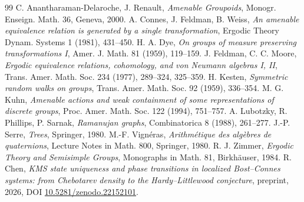 \documentclass[11pt]{amsart}
\numberwithin{equation}{section}
\theoremstyle{definition}
\theoremstyle{remark}
\begin{document}
\begin{thebibliography}{99}
 C. Anantharaman-Delaroche, J. Renault, \emph{Amenable Groupoids}, Monogr.
Enseign. Math. 36, Geneva, 2000.
 A. Connes, J. Feldman, B. Weiss, \emph{An amenable equivalence relation is generated
by a single transformation}, Ergodic Theory Dynam. Systems 1 (1981), 431--450.
 H. A. Dye, \emph{On groups of measure preserving transformations I}, Amer. J. Math.
81 (1959), 119--159.
 J. Feldman, C. C. Moore, \emph{Ergodic equivalence relations, cohomology, and von
Neumann algebras I, II}, Trans. Amer. Math. Soc. 234 (1977), 289--324, 325--359.
 H. Kesten, \emph{Symmetric random walks on groups}, Trans. Amer. Math. Soc. 92
(1959), 336--354.
 M. G. Kuhn, \emph{Amenable actions and weak containment of some representations of
discrete groups}, Proc. Amer. Math. Soc. 122 (1994), 751--757.
 A. Lubotzky, R. Phillips, P. Sarnak, \emph{Ramanujan graphs}, Combinatorica 8
(1988), 261--277.
 J.-P. Serre, \emph{Trees}, Springer, 1980.
 M.-F. Vign\'eras, \emph{Arithm\'etique des alg\`ebres de quaternions}, Lecture
Notes in Math. 800, Springer, 1980.
 R. J. Zimmer, \emph{Ergodic Theory and Semisimple Groups}, Monographs in Math.
81, Birkh\"auser, 1984.
 R. Chen, \emph{KMS state uniqueness and phase transitions in localized Bost--Connes
systems: from Chebotarev density to the Hardy--Littlewood conjecture}, preprint, 2026, DOI
\href{https://doi.org/10.5281/zenodo.22152101}{10.5281/zenodo.22152101}.
\end{thebibliography}
\end{document}
